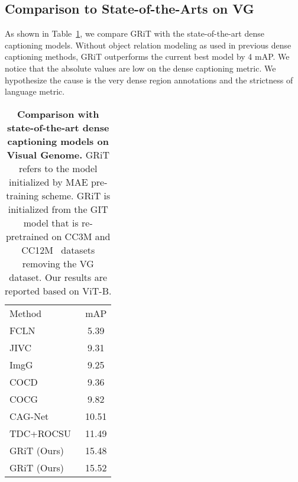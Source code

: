 \documentclass[10pt,twocolumn,letterpaper]{article}
\begin{document}
\subsection{Comparison to State-of-the-Arts on VG}
As shown in Table~\ref{tab:sota_densecap}, we compare GRiT with the state-of-the-art dense captioning models. Without object relation modeling as used in previous dense captioning methods, GRiT outperforms the current best model by 4 mAP. We notice that the absolute values are low on the dense captioning metric. We hypothesize the cause is the very dense region annotations and the strictness of language metric.

\begin{table}[t]
\vspace{-3mm}
	\begin{center}	
		\setlength{\tabcolsep}{10pt}
		\begin{tabular}{l|c}
			\rowcolor{mygray}
			Method&mAP\\ 
			\shline
            FCLN~\cite{johnson2016densecap}&5.39\\
            JIVC~\cite{yang2017dense}&9.31\\
            ImgG~\cite{li2019learning}&9.25\\
            COCD~\cite{li2019learning}&9.36\\
            COCG~\cite{li2019learning}&9.82\\
            CAG-Net~\cite{yin2019context}&10.51\\
            TDC+ROCSU~\cite{shao2022region}&11.49\\
            \hline
            GRiT (Ours)&15.48\\
			GRiT (Ours)&15.52\\
			\hline
		\end{tabular}
	\end{center}
    \vspace{-4mm}
	\caption{\textbf{Comparison with state-of-the-art dense captioning models on Visual Genome.} GRiT refers to the model initialized by MAE pre-training scheme. GRiT is initialized from the GIT model that is re-pretrained on CC3M and CC12M~\cite{sharma2018conceptual} datasets removing the VG dataset. Our results are reported based on ViT-B.}
	\vspace{-4mm}
	\label{tab:sota_densecap}
\end{table}
\end{document}
